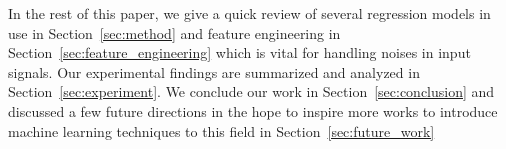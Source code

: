 In the rest of this paper, we give a quick review of several regression models in use in Section~\ref{sec:method} and feature engineering in Section~\ref{sec:feature_engineering} which is vital for handling noises in input signals. Our experimental findings are summarized and analyzed in Section~\ref{sec:experiment}. We conclude our work in Section~\ref{sec:conclusion} and discussed a few future directions in the hope to inspire more works to introduce machine learning techniques to this field in Section~\ref{sec:future_work}
